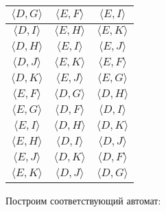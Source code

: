 \documentclass[a4paper, 12pt]{article}
\begin{document}
\begin{center}
\begin{tabular}{||c | c | c ||}
  $ \langle D, G \rangle $ & $ \langle E, F \rangle $ & $ \langle E, I \rangle $ \\ \hline
  $ \langle D, I \rangle $ & $ \langle E, H \rangle $ & $ \langle E, K \rangle $ \\ \hline
  $ \langle D, H \rangle $ & $ \langle E, I \rangle $ & $ \langle E, J \rangle $  \\ \hline
  $ \langle D, J \rangle $ & $ \langle E, K \rangle $ & $ \langle E, F \rangle $ \\ \hline
  $ \langle D, K \rangle $ & $ \langle E, J \rangle $ & $ \langle E, G \rangle $ \\ \hline
  $ \langle E, F \rangle $ & $ \langle D, G \rangle $ & $ \langle D, H \rangle $ \\ \hline
  $ \langle E, G \rangle $ & $ \langle D, F \rangle $ & $ \langle D, I \rangle $ \\ \hline
  $ \langle E, I \rangle $ & $ \langle D, H \rangle $ & $ \langle D, K \rangle $ \\ \hline
  $ \langle E, H \rangle $ & $ \langle D, I \rangle $ & $ \langle D, J \rangle $  \\ \hline
  $ \langle E, J \rangle $ & $ \langle D, K \rangle $ & $ \langle D, F \rangle $ \\ \hline
  $ \langle E, K \rangle $ & $ \langle D, J \rangle $ & $ \langle D, G \rangle $ \\ \hline
\end{tabular}
\end{center}

Построим соответствующий автомат:
\end{document}

